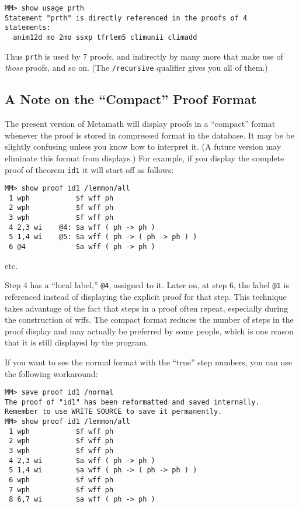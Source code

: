 \begin{verbatim}
MM> show usage prth
Statement "prth" is directly referenced in the proofs of 4
statements:
  anim12d mo 2mo ssxp tfrlem5 climunii climadd
\end{verbatim}

Thus \texttt{prth} is used by 7 proofs, and indirectly by many more that
make use of {\em those} proofs, and so on.  (The \texttt{/recursive}
qualifier gives you all of them.)

\subsection{A Note on the ``Compact'' Proof Format}

The present version of Metamath will display proofs in a ``compact''
format whenever the proof is stored in compressed format in the database.  It
may be be slightly confusing unless you know how to interpret it.  (A
future version may eliminate this format from displays.)  For example,
if you display the complete proof of theorem \texttt{id1} it will start
off as follows:

\begin{verbatim}
MM> show proof id1 /lemmon/all
 1 wph           $f wff ph
 2 wph           $f wff ph
 3 wph           $f wff ph
 4 2,3 wi    @4: $a wff ( ph -> ph )
 5 1,4 wi    @5: $a wff ( ph -> ( ph -> ph ) )
 6 @4            $a wff ( ph -> ph )
\end{verbatim}

\begin{center}
{etc.}
\end{center}

Step 4 has a ``local label,'' \texttt{@4}, assigned to it.
Later on, at step 6, the label \texttt{@1} is referenced instead of
displaying the explicit proof for that step.  This technique takes advantage
of the fact that steps in a proof often repeat, especially during the
construction of wffs.  The compact format reduces the number of steps in the
proof display and may actually be preferred by some people, which is one
reason that it is still displayed by the program.

If you want to see the normal format with the ``true'' step numbers, you can
use the following workaround:

\begin{verbatim}
MM> save proof id1 /normal
The proof of "id1" has been reformatted and saved internally.
Remember to use WRITE SOURCE to save it permanently.
MM> show proof id1 /lemmon/all
 1 wph           $f wff ph
 2 wph           $f wff ph
 3 wph           $f wff ph
 4 2,3 wi        $a wff ( ph -> ph )
 5 1,4 wi        $a wff ( ph -> ( ph -> ph ) )
 6 wph           $f wff ph
 7 wph           $f wff ph
 8 6,7 wi        $a wff ( ph -> ph )
\end{verbatim}

